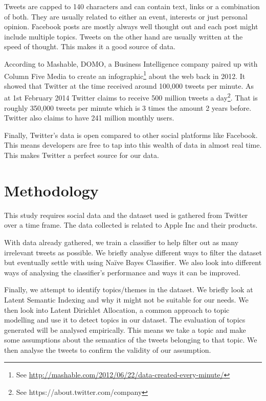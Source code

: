 Tweets are capped to 140 characters and can contain text, links or a combination of both. They are
usually related to either an event, interests or just personal opinion. Facebook posts are mostly
always well thought out and each post might include multiple topics. Tweets on the other hand are
usually written at the speed of thought. This makes it a good source of data.

According to Mashable, DOMO, a Business Intelligence company paired up with Column Five Media to
create an infographic\footnote{See \url{http://mashable.com/2012/06/22/data-created-every-minute/}}
about the web back in 2012. It showed that Twitter at the time received around 100,000 tweets per
minute. As at 1st February 2014 Twitter claims to receive 500 million tweets a day\footnote{See
https://about.twitter.com/company}. That is roughly 350,000 tweets per minute which is 3 times the
amount 2 years before. Twitter also claims to have 241 million monthly users.

Finally, Twitter's data is open compared to other social platforms like Facebook. This means
developers are free to tap into this wealth of data in almost real time. This makes Twitter a
perfect source for our data.


\section{Methodology}
\label{sec:methodology}
This study requires social data and the dataset used is gathered from Twitter over a time frame.
The data collected is related to Apple Inc and their products.

With data already gathered, we train a classifier to help filter out as many irrelevant tweets as
possible. We briefly analyse different ways to filter the dataset but eventually settle with using
Na\"{i}ve Bayes Classifier. We also look into different ways of analysing the classifier's
performance and ways it can be improved.

Finally, we attempt to identify topics/themes in the dataset. We briefly look at Latent Semantic
Indexing and why it might not be suitable for our needs. We then look into Latent Dirichlet
Allocation, a common approach to topic modelling and use it to detect topics in our dataset. The
evaluation of topics generated will be analysed empirically. This means we take a topic and make
some assumptions about the semantics of the tweets belonging to that topic. We then analyse the
tweets to confirm the validity of our assumption.


